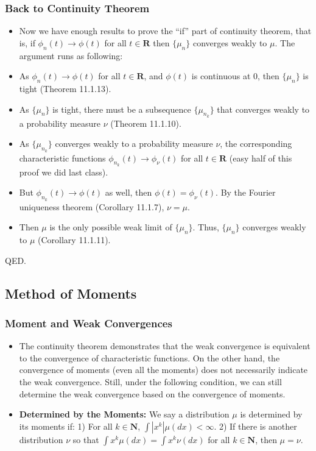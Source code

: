\documentclass[handout]{beamer}
\begin{document}
 
    \frame
{
  \frametitle{Back to Continuity Theorem}

 \begin{itemize}

\item<1-> Now we have enough results to prove the ``if'' part of continuity theorem, that is, if $\phi_n(t)\rightarrow \phi(t)$ for all $t\in \mathbf{R}$ then $\{\mu_n\}$ converges weakly to $\mu$. The argument runs as following:

\item<2-> [(a)] As $\phi_n(t)\rightarrow \phi(t)$ for all $t\in \mathbf{R}$, and $\phi(t)$ is continuous at $0$, then $\{\mu_n\}$ is tight (Theorem 11.1.13).

\item<3->[(b)] As $\{\mu_n\}$ is tight, there must be a subsequence $\{\mu_{n_k}\}$ that converges weakly to a probability measure $\nu$ (Theorem 11.1.10).

\item<4->[(c)] As $\{\mu_{n_k}\}$  converges weakly to a probability measure $\nu$, the corresponding characteristic functions $\phi_{n_k} (t)\rightarrow \phi_{\nu} (t)$ for all $t\in \mathbf{R}$ (easy half of this proof we did last class).

\item<5->[(d)] But $\phi_{n_k} (t)\rightarrow \phi (t)$ as well, then $ \phi (t)= \phi_{\nu} (t)$. By the Fourier uniqueness theorem (Corollary 11.1.7), $\nu=\mu$.

\item<6-> [(e)] Then $\mu$ is the only possible weak limit of $\{\mu_n\}$. Thus, $\{\mu_n\}$ converges weakly to $\mu$ (Corollary 11.1.11). 
\end{itemize}

QED.
 }
 
 \subsection{Method of Moments}
 
 
  
\frame
{
  \frametitle{Moment and Weak Convergences}

 \begin{itemize}

\item<1-> The continuity theorem demonstrates that the weak convergence is equivalent to the convergence of characteristic functions. On the other hand, the convergence of moments (even all the moments) does not necessarily indicate the weak convergence. Still, under the following condition, we can still determine the weak convergence based on the convergence of moments. 

\item<2-> \textbf{Determined by the Moments:} We say a distribution $\mu$ is determined by its moments if: 1) For all $k\in \mathbf{N}$, $\int |x^k| \mu(dx)<\infty$. 2) If there is another distribution $\nu$ so that $\int x^k \mu(dx)=\int x^k \nu(dx)$ for all $k\in \mathbf{N}$, then $\mu=\nu$.
\end{itemize}
 }
\end{document}
